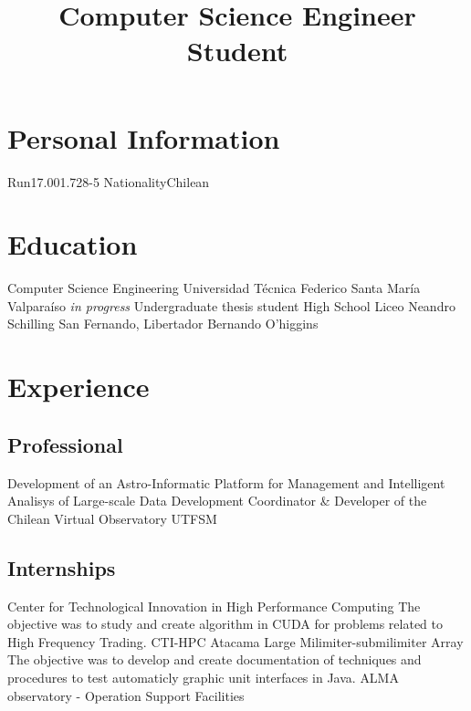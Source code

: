 \documentclass[11pt,a4paper]{moderncv}
\title{Computer Science Engineer Student}
\begin{document}
\maketitle

\section{Personal Information}
		{Run}{17.001.728-5}
						{Nationality}{Chilean}
							{}{}

\section{Education}
	{Computer Science Engineering}
	{Universidad Técnica Federico Santa María}
	{Valparaíso}
	{\emph{in progress}}
	{Undergraduate thesis student}
	{High School}
	{Liceo Neandro Schilling}
	{San Fernando, Libertador Bernando O'higgins}
	{}{}
\vspace{-0.5cm}

\section{Experience}
\subsection{Professional}
	{Development of an Astro-Informatic Platform for Management and Intelligent Analisys of Large-scale Data}
	{Development Coordinator \& Developer of the Chilean Virtual Observatory}
	{UTFSM}
	{}{}

\subsection{Internships}
	{Center for Technological Innovation in High Performance Computing}
	{The objective was to study and create algorithm in CUDA for problems related to High Frequency Trading.}
	{CTI-HPC}
	{}{}
	{Atacama Large Milimiter-submilimiter Array}
	{The objective was to develop and create documentation of techniques and
	procedures to test automaticly graphic unit interfaces in Java.}
	{ALMA observatory - Operation Support Facilities}
	{}{}
\end{document}
